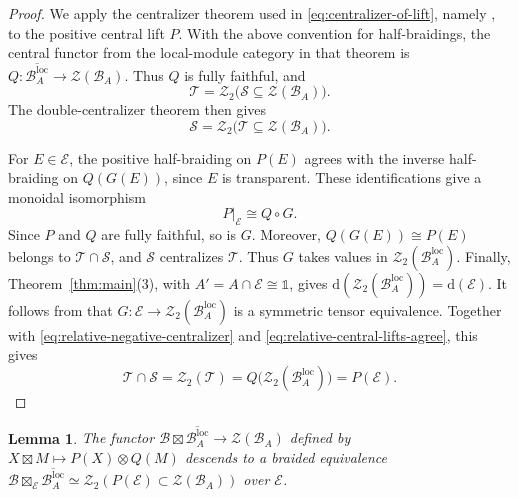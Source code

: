\documentclass[10pt,a4paper]{amsart}
\numberwithin{equation}{section}
\newtheorem{lemma}[thmctr]{Lemma}
\newcommand{\unit}{\mathds{1}}
\newcommand{\B}{\mathcal{B}}
\newcommand{\E}{\mathcal{E}}
\newcommand{\Z}{\mathcal{Z}}
\newcommand{\T}{\mathcal{T}}
\newcommand{\cS}{\mathcal{S}}
\newcommand{\loc}{\mathrm{loc}}
\newcommand{\FP}{\mathrm{d}}
\begin{document}
\begin{proof}
We apply the centralizer theorem used in \eqref{eq:centralizer-of-lift}, namely
\cite[Theorem~5.13]{shimizu2026commutative}, to the positive central lift
$P$. With the above convention for half-braidings, the central functor from
the local-module category in that theorem is
$Q:\overline{\B_A^\loc}\to\Z(\B_A)$. Thus $Q$ is fully faithful, and
\begin{equation}\label{eq:relative-positive-centralizer}
  \T = \Z_2\bigl(\cS\subseteq\Z(\B_A)\bigr).
\end{equation}
The double-centralizer theorem \cite[Theorem~4.9]{shimizu2019non} then gives
\begin{equation}\label{eq:relative-negative-centralizer}
  \cS
  =
  \Z_2\bigl(\T\subseteq\Z(\B_A)\bigr).
\end{equation}

For $E\in\E$, the positive half-braiding on $P(E)$ agrees with the inverse
half-braiding on $Q(G(E))$, since $E$ is transparent. These identifications
give a monoidal isomorphism
\begin{equation}\label{eq:relative-central-lifts-agree}
  P|_{\E}\cong Q\circ G.
\end{equation}
Since $P$ and $Q$ are fully faithful, so is $G$. Moreover,
$Q(G(E))\cong P(E)$ belongs to $\T\cap\cS$, and $\cS$ centralizes $\T$.
Thus $G$ takes values in $\Z_2(\B_A^\loc)$. Finally,
Theorem~\ref{thm:main}(3), with $A'=A\cap\E\cong\unit$, gives
$\FP(\Z_2(\B_A^\loc))=\FP(\E)$. It follows from
\cite[Proposition~6.3.3]{etingof2016tensor} that
$G:\E\to\Z_2(\B_A^\loc)$ is a symmetric tensor equivalence.
Together with \eqref{eq:relative-negative-centralizer} and
\eqref{eq:relative-central-lifts-agree}, this gives
\begin{equation}\label{eq:relative-centralizer-intersection}
  \T\cap\cS = \Z_2(\T) =  Q\bigl(\Z_2(\B_A^\loc)\bigr) = P(\E).
\end{equation}
\end{proof}

\begin{lemma}\label{lem:relative-center-factorization}
The functor $\B\boxtimes\overline{\B_A^\loc}\to\Z(\B_A)$ defined by
$X\boxtimes M\mapsto P(X)\otimes Q(M)$ descends to a braided equivalence
$\B\boxtimes_{\E}\overline{\B_A^\loc}\simeq\Z_2(P(\E)\subset \Z(\B_A))$ over $\E$.
\end{lemma}
\end{document}
